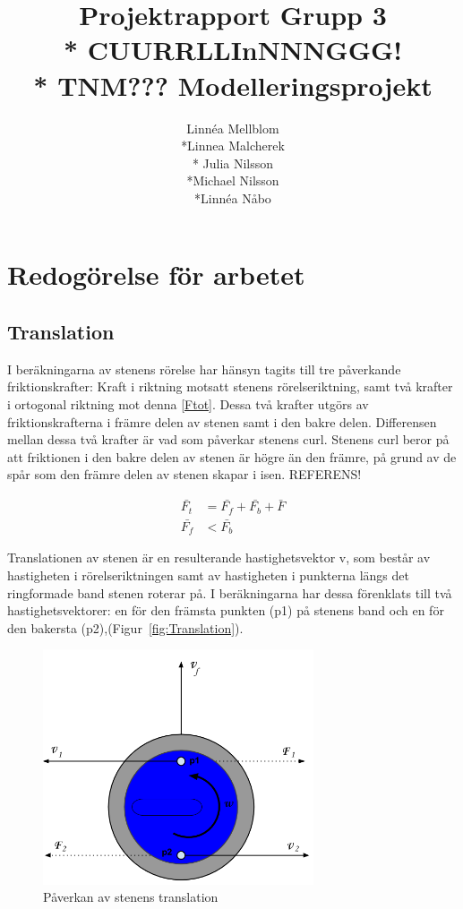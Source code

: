 \documentclass[11pt]{article} %
\title{Projektrapport Grupp 3 \\* 
CUURRLLInNNNGGG!\\*
TNM??? Modelleringsprojekt}
\author{Linnéa Mellblom\\*Linnea Malcherek\\* Julia Nilsson\\*Michael Nilsson\\*Linnéa Nåbo}
\begin{document}
\maketitle
\pagebreak
{}  

\section{Redogörelse för arbetet}

\subsection{Translation}

I beräkningarna av stenens rörelse har hänsyn tagits till tre påverkande friktionskrafter: Kraft i riktning motsatt stenens rörelseriktning, samt två krafter i ortogonal riktning mot denna \eqref{Ftot}. Dessa två krafter utgörs av friktionskrafterna i främre delen av stenen samt i den bakre delen. Differensen mellan dessa två krafter är vad som påverkar stenens curl. 
Stenens curl beror på att friktionen i den bakre delen av stenen är högre än den främre, på grund av de spår som den främre delen av stenen skapar i isen. REFERENS! 

 \begin{align}\label{Ftot}
 \bar{F_t}&=\bar{F_f}+\bar{F_b}+\bar{F}\\
 \bar{F_f}&<\bar{F_b}
 \end{align}

Translationen av stenen är en resulterande hastighetsvektor v, som består av hastigheten i rörelseriktningen samt av hastigheten i punkterna längs det ringformade band stenen roterar på. I beräkningarna har dessa förenklats till två hastighetsvektorer: en för den främsta punkten (p1)  på stenens band och en för den bakersta (p2),(Figur~\ref{fig:Translation}). 

\begin{figure}[ht!]
\centering
\includegraphics[width=80mm]{Translation.png}
\caption{Påverkan av stenens translation}
\label{fig:Translation}
\label{overflow}
\end{figure}
\end{document}
